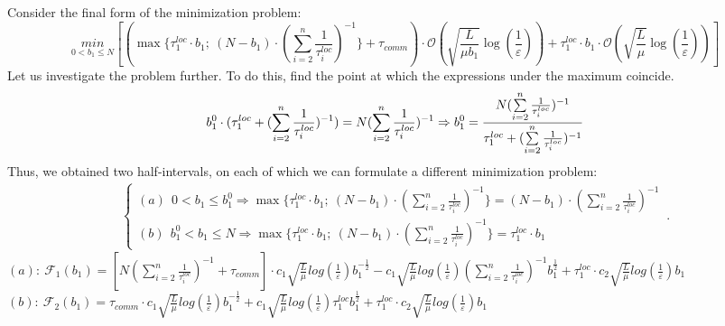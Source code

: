\documentclass{article}
\begin{document}
Consider the final form of the minimization problem:
\\
\begin{equation}
     \label{eq:fm1}
    \underset{0 < b_1 \leq N}{min}[(\max\{\tau_1^{loc}\cdot b_1; ~(N-b_1) \cdot (\sum\limits_{i = 2}^{n} \frac{1}{\tau_i^{loc}} )^{-1}\} + \tau_{comm}) \cdot \mathcal O(\sqrt{\frac{L}{\mu b_1}}\log(\frac{1}{\varepsilon})) + \tau_1^{loc}\cdot b_1 \cdot \mathcal O(\sqrt{\frac{L}{\mu}}\log(\frac{1}{\varepsilon}))] 
\end{equation}
Let us investigate the problem further. To do this, find the point at which the expressions under the maximum coincide. 
\begin{equation}
    \notag
    b_1^0 \cdot (\tau_1^{loc} + (\sum\limits_{i = 2}^{n} \frac{1}{\tau_i^{loc}})^{-1}) = N (\sum\limits_{i = 2}^{n} \frac{1}{\tau_i^{loc}})^{-1} \Rightarrow b_1^0 = \frac{N (\sum\limits_{i = 2}^{n} \frac{1}{\tau_i^{loc}})^{-1}}{\tau_1^{loc} + (\sum\limits_{i = 2}^{n} \frac{1}{\tau_i^{loc}})^{-1}}
\end{equation}
Thus, we obtained two half-intervals, on each of which we can formulate a different minimization problem:
\begin{eqnarray}
\label{half-int}
    \begin{cases}
    (a) ~ ~ 0 < b_1 \leq b_1^0 \Rightarrow \max\{\tau_1^{loc}\cdot b_1; ~(N-b_1) \cdot (\sum\limits_{i = 2}^{n} \frac{1}{\tau_i^{loc}} )^{-1}\} = 
    (N-b_1) \cdot (\sum\limits_{i = 2}^{n} \frac{1}{\tau_i^{loc}})^{-1}
    \\
    (b) ~ ~ b_1^0 <  b_1 \leq N \Rightarrow \max\{\tau_1^{loc}\cdot b_1; ~(N-b_1) \cdot (\sum\limits_{i = 2}^{n} \frac{1}{\tau_i^{loc}} )^{-1}\} = \tau_1^{loc}\cdot b_1
    \end{cases}\,.
\end{eqnarray}
$(a): ~\mathcal{F}_1(b_1) = [N (\sum\limits_{i = 2}^{n} \frac{1}{\tau_i^{loc}})^{-1} + \tau_{comm}]\cdot 
c_1 \sqrt{\frac{L}{\mu}}log (\frac{1}{\varepsilon})  b_1^{-\frac{1}{2}} - 
c_1  \sqrt{\frac{L}{\mu}}log (\frac{1}{\varepsilon})(\sum\limits_{i =
2}^{n} \frac{1}{\tau_i^{loc}})^{-1} b_1^{\frac{1}{2}}  + \tau_1^{loc}\cdot c_2  \sqrt{\frac{L}{\mu}}log (\frac{1}{\varepsilon}) b_1 $\\
$(b): ~\mathcal{F}_2(b_1) = \tau_{comm}\cdot 
c_1 \sqrt{\frac{L}{\mu}}log (\frac{1}{\varepsilon})  b_1^{-\frac{1}{2}} + 
c_1  \sqrt{\frac{L}{\mu}}log (\frac{1}{\varepsilon})\tau_1^{loc} b_1^{\frac{1}{2}}  + \tau_1^{loc}\cdot c_2  \sqrt{\frac{L}{\mu}}log (\frac{1}{\varepsilon}) b_1 $\\
\end{document}
